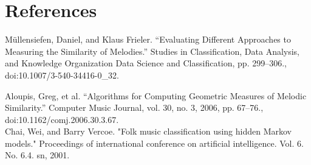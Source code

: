 \documentclass{article}
\begin{document}
	\section{References}
 	Müllensiefen, Daniel, and Klaus Frieler. “Evaluating Different Approaches to Measuring the Similarity of Melodies.” Studies in Classification, Data Analysis, and Knowledge Organization Data Science and Classification, pp. 299–306., doi:10.1007/3-540-34416-0\_32.
	\newline
	
	\noindent
	Aloupis, Greg, et al. “Algorithms for Computing Geometric Measures of Melodic Similarity.” Computer Music Journal, vol. 30, no. 3, 2006, pp. 67–76., doi:10.1162/comj.2006.30.3.67.
	\\
	
	\noindent
	Chai, Wei, and Barry Vercoe. "Folk music classification using hidden Markov models." Proceedings of international conference on artificial intelligence. Vol. 6. No. 6.4. sn, 2001.
	
	
	
\end{document}
